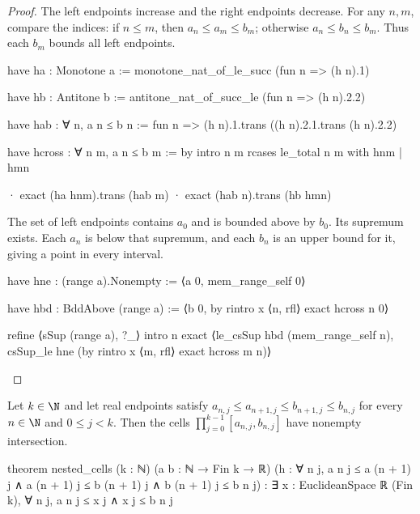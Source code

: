 \begin{proof}
  The left endpoints increase and the right endpoints decrease.
  For any $n,m$, compare the indices: if $n\leq m$, then $a_n\leq a_m\leq b_m$; otherwise $a_n\leq
    b_n\leq b_m$.
  Thus each $b_m$ bounds all left endpoints.

  \begin{lean}
    have ha : Monotone a := monotone_nat_of_le_succ (fun n => (h n).1)

    have hb : Antitone b := antitone_nat_of_succ_le (fun n => (h n).2.2)

    have hab : ∀ n, a n ≤ b n := fun n => (h n).1.trans ((h n).2.1.trans (h n).2.2)

    have hcross : ∀ n m, a n ≤ b m := by
      intro n m
      rcases le_total n m with hnm | hmn

      · exact (ha hnm).trans (hab m)
      · exact (hab n).trans (hb hmn)
  \end{lean}

  The set of left endpoints contains $a_0$ and is bounded above by $b_0$.
  Its supremum exists.
  Each $a_n$ is below that supremum, and each $b_n$ is an upper bound for it, giving a point in
  every interval.

  \begin{lean}
    have hne : (range a).Nonempty := ⟨a 0, mem_range_self 0⟩

    have hbd : BddAbove (range a) := ⟨b 0, by
      rintro x ⟨n, rfl⟩
      exact hcross n 0⟩

    refine ⟨sSup (range a), ?_⟩
    intro n
    exact ⟨le_csSup hbd (mem_range_self n), csSup_le hne (by
      rintro x ⟨m, rfl⟩
      exact hcross m n)⟩
  \end{lean}

\end{proof}

\begin{theorem}
  \label{ma:thm:nested-k-cells}
  Let $k\in\N$ and let real endpoints satisfy $a_{n,j}\leq a_{n+1,j}\leq b_{n+1,j}\leq b_{n,j}$
  for every $n\in\N$ and $0\leq j<k$.
  Then the cells $\prod_{j=0}^{k-1}[a_{n,j},b_{n,j}]$ have nonempty intersection.

  \begin{lean}
    theorem nested_cells (k : ℕ) (a b : ℕ → Fin k → ℝ)
        (h : ∀ n j, a n j ≤ a (n + 1) j ∧
          a (n + 1) j ≤ b (n + 1) j ∧ b (n + 1) j ≤ b n j) :
        ∃ x : EuclideanSpace ℝ (Fin k), ∀ n j, a n j ≤ x j ∧ x j ≤ b n j
  \end{lean}
\end{theorem}

